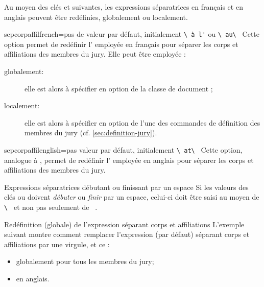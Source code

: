 Au moyen des clés  et 
suivantes, les expressions séparatrices en français et en anglais peuvent être
redéfinies, globalement ou localement.

\begin{docKey}{sepcorpaffilfrench}{=}{pas de valeur par
    défaut, initialement \lstinline[showspaces]+\ à l'+ ou \lstinline[showspaces]+\ au\ +}
  Cette option permet de redéfinir l' employée en français
  pour séparer les corps et affiliations des membres du jury. Elle peut
  être employée :
  \begin{description}
  \item[globalement:] elle est alors à spécifier en option de la classe de
    document ;
  \item[localement:] elle est alors à spécifier en option de l'une des
    commandes de définition des membres du jury (cf.
    \vref{sec:definition-jury}).
  \end{description}
\end{docKey}

\begin{docKey}{sepcorpaffilenglish}{=}{pas valeur par
    défaut, initialement \lstinline[showspaces]+\ at\ +}
  Cette option, analogue à , permet de redéfinir
  l' employée en anglais pour séparer les corps et
  affiliations des membres du jury.
\end{docKey}

\begin{dbwarning}{Expressions séparatrices débutant ou finissant par un espace}{}
  Si les valeurs des clés  ou
   doivent \emph{débuter} ou \emph{finir} par un
  espace, celui-ci doit être saisi au moyen de
  \lstinline[showspaces]+\ +
  et non pas seulement de
  \lstinline[showspaces]+ +.
\end{dbwarning}

\begin{dbexample}{Redéfinition (globale) de l'expression séparant corps et
    affiliations}{}
  L'exemple suivant montre comment remplacer l'expression (par défaut) séparant
  corps et affiliations par une virgule, et ce :
  \begin{itemize}
  \item globalement pour tous les membres du jury;
  \item en anglais.
  \end{itemize}
\end{dbexample}

